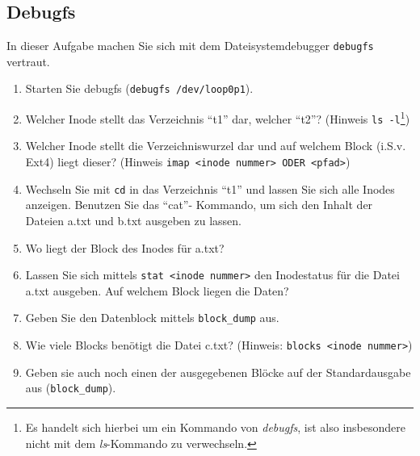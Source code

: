 \documentclass[11pt,a4paper]{article}
\def\inlinebash{\lstinline[style=bash]}
\begin{document}
\subsection{Debugfs}
In dieser Aufgabe machen Sie sich mit dem Dateisystemdebugger
\inlinebash$debugfs$ vertraut.

\begin{enumerate}
	\item Starten Sie debugfs (\inlinebash$debugfs /dev/loop0p1$).
	\item Welcher Inode stellt das Verzeichnis ``t1'' dar, welcher ``t2''?
		(Hinweis \inlinebash$ls -l$\footnote{
			Es handelt sich hierbei um ein Kommando von \emph{debugfs}, ist also
			insbesondere nicht mit dem \emph{ls}-Kommando zu verwechseln.})
	\item Welcher Inode stellt die Verzeichniswurzel dar und
		auf welchem Block (i.S.v. Ext4) liegt dieser?
		(Hinweis \inlinebash$imap <inode nummer> ODER <pfad>$)
	\item Wechseln Sie mit \inlinebash$cd$ in das Verzeichnis ``t1'' und lassen
		Sie sich alle Inodes anzeigen. Benutzen Sie das ``cat''-
		Kommando, um sich den Inhalt der Dateien a.txt und b.txt
		ausgeben zu lassen.
	\item Wo liegt der Block des Inodes für a.txt?
	\item Lassen Sie sich mittels \inlinebash$stat <inode nummer>$ den
		Inodestatus für die Datei a.txt ausgeben.
		Auf welchem Block liegen die Daten?
	\item Geben Sie den Datenblock mittels \inlinebash$block_dump$ aus.
	\item Wie viele Blocks benötigt die Datei c.txt?
		(Hinweis: \inlinebash$blocks <inode nummer>$)
	\item Geben sie auch noch einen der ausgegebenen Blöcke
		auf der Standardausgabe aus (\inlinebash$block_dump$).
\end{enumerate}
\end{document}
